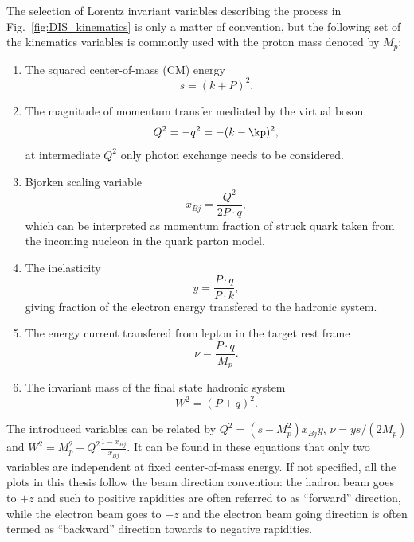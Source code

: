 The selection of Lorentz invariant variables describing the process in
Fig.~\ref{fig:DIS_kinematics} is only a matter of convention, but the following
set of the kinematics variables is commonly used with the proton mass denoted by $M_{p}$:
\begin{enumerate}
\item The squared center-of-mass (CM) energy
\begin{equation}
	s = (k+P)^{2}.
\end{equation}

\item The magnitude of momentum transfer mediated by the virtual boson
\begin{equation}
Q^{2} = -q^{2} = -(k-\kp)^{2},
\end{equation}
at intermediate $Q^{2}$ only photon exchange needs to be considered.

\item Bjorken scaling variable
\begin{equation}
x_{Bj} = \frac{Q^{2}}{2P\cdot q},
\end{equation}
which can be interpreted as momentum fraction of
struck quark taken from the incoming nucleon in the quark parton model.

\item The inelasticity
\begin{equation}
y = \frac{P\cdot q}{ P\cdot k},
\end{equation}
giving fraction of the electron energy transfered to
the hadronic system.

\item The energy current transfered from lepton in the target rest frame
\begin{equation}
\nu = \frac{P\cdot q}{ M_{p} }.
\end{equation}

\item The invariant mass of the final state hadronic system
\begin{equation}
W^{2} = (P+q)^{2}.
\end{equation}

\end{enumerate}

The introduced variables can be related by
$Q^{2}=(s-M^{2}_{p})x_{Bj}y$, $\nu = ys/(2M_{p})$ and
$W^{2}=M^{2}_{p}+Q^{2}\frac{1-x_{Bj}}{x_{Bj}}$. It can be found in these
equations that only two variables are independent at fixed center-of-mass
energy. If not specified, all the plots in this thesis follow the beam direction
convention: the hadron beam goes to $+z$ and such to positive rapidities are
often referred to as ``forward'' direction, while the electron beam goes to $-z$
and the electron beam going direction is often termed as ``backward'' direction
towards to negative rapidities.



